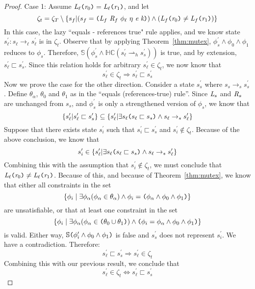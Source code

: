 \begin{proof}
Case 1: Assume $\emph{L}_\ell \texttt{(} \emph{r}_0\texttt{)} = \emph{L}_\ell \texttt{(} \emph{r}_1 \texttt{)}$, and let 
$$\zeta_t = \zeta_T \setminus \{ s_f | (s_f= \texttt{(} \emph{L}_f\ \emph{R}_f\ \phi_\ell\ \eta\ \emph{e}\ \emph{k}\texttt{)}) \wedge (\emph{L}_f \texttt{(} \emph{r}_0\texttt{)} \neq \emph{L}_f \texttt{(} \emph{r}_1 \texttt{)} ) \}$$
In this case, the lazy ``equals - references true" rule applies, and we know state $s_\ell^\prime : s_\ell \rightarrow_\ell s_\ell^\prime$ is in $\zeta_t$. Observe that by applying Theorem~\ref{thm:mutex}, $\phi_s^\prime \wedge \phi_0 \wedge \phi_1$ reduces to $\phi_s$. Therefore, $\mathbb{S}( \phi_s^\prime \wedge \mathbb{HC}(s_\ell^\prime \rightharpoonup_{h} s_s^\prime) ) $ is true, and by extension, $s_\ell^\prime \sqsubset s_s^\prime$. Since this relation holds for arbitrary $s_\ell^\prime \in \zeta_t$, we now know that $$s_\ell^\prime \in \zeta_t \Rightarrow s_\ell^\prime \sqsubset s_s^\prime$$
Now we prove the case for the other direction. Consider a state $s_s^\prime$ where  $s_s \rightarrow_s s_s^\prime$. Define $\theta_\alpha$, $\theta_0$ and $\theta_1$ as in the ``equals (references-true) rule''. Since $\emph{L}_s$ and $\emph{R}_s$ are unchanged from $s_s$, and $\phi_s^\prime$ is only a strengthened version of $\phi_s$,  we know that
$$\{s_\ell^\prime | s_\ell^\prime \sqsubset s_s^\prime \} \subseteq \{s_\ell^\prime | \exists s_\ell \texttt{(} s_\ell \sqsubset s_s \texttt{)} \wedge s_\ell \rightarrow_s s_\ell^\prime\} $$
Suppose that there exists state $s_i^\prime$ such that $s_i^\prime \sqsubset s_s^\prime$ and $s_i^\prime \notin \zeta_t$. Because of the above conclusion, we know that $$s_i^\prime \in \{s_\ell^\prime | \exists s_\ell \texttt{(} s_\ell \sqsubset s_s\texttt{)} \wedge s_\ell \rightarrow_s s_\ell^\prime\}$$ 
Combining this with the assumption that $s_i^\prime \notin \zeta_t$, we must conclude that $\emph{L}_\ell \texttt{(} \emph{r}_0\texttt{)} \neq  \emph{L}_\ell \texttt{(} \emph{r}_1 \texttt{)}$. Because of this, and because of Theorem~\ref{thm:mutex}, we know that either all constraints in the set
$$\{\phi_i \mid \exists \phi_\alpha (\phi_\alpha \in \theta_\alpha)\wedge \phi_i = \texttt{(}\phi_\alpha \wedge \phi_0 \wedge \phi_1\texttt{)}\}$$ are unsatisfiable, or that at least one constraint in the set
$$\{\phi_i \mid \exists \phi_\alpha (\phi_\alpha \in \texttt{(} \theta_0 \cup \theta_1 \texttt{)})\wedge \texttt{(} \phi_i = \phi_\alpha \wedge \phi_0 \wedge \phi_1 \texttt{)}\}$$ 
is valid. Either way, $\mathbb{S}\texttt{(}\phi_i^\prime \wedge\phi_0\wedge \phi_1\texttt{)}$ is false and $s_s^\prime$ does not represent $s_i^\prime$. We have a contradiction. Therefore: $$s_\ell^\prime \sqsubset s_s^\prime \Rightarrow s_\ell^\prime \in \zeta_t$$
Combining this with our previous result, we conclude that $$s_\ell^\prime \in \zeta_t \Leftrightarrow s_\ell^\prime \sqsubset s_s^\prime$$


\end{proof}
